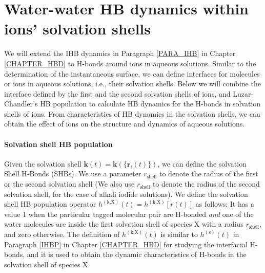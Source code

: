 \FloatBarrier
\section{Water-water HB dynamics within ions' solvation shells} \label{PARA_SHBD}
We will extend the IHB dynamics in Paragraph \ref{PARA_IHB} in Chapter \ref{CHAPTER_HBD} to H-bonds around ions in aqueous solutions. 
Similar to the determination of the instantaneous surface, we can define interfaces for molecules or ions in aqueous solutions, i.e., 
their solvation shells. 
Below we will combine the interface defined by the first and the second solvation shells of ions, 
and Luzar-Chandler's HB population \cite{AL96} to calculate HB
dynamics for the H-bonds in solvation shells of ions.
From characteristics of HB dynamics in the solvation shells, we can obtain the effect of ions on the structure and dynamics of aqueous solutions. 

\paragraph{Solvation shell HB population}\label{para:SHBP}
Given the solvation shell ${\mathbf k}(t)={\mathbf k}(\{{\mathbf r}_i(t)\})$, we can define the solvation Shell H-Bonds (SHBs).
We use a parameter $r_\text{shell}$ to denote the radius of the first or the second solvation shell 
(We also use $r_\text{shell}$ to denote the radius of the second solvation shell, for the case of alkali iodide solutions). 
We define the solvation shell HB population operator $h^{(\text{k,X})}(t) = h^{(\text{k,X})}[{r}(t)]$ as follows:
It has a value 1 when the particular tagged molecular pair are H-bonded \emph{and} one of the water molecules are inside the first solvation shell of species X
with a radius $r_\text{shell}$, and zero otherwise. 
The definition of $h^{(\text{k,X})}(t)$ is similar to $h^{(\text{s})}(t)$ in Paragraph \ref{IHBP} in Chapter \ref{CHAPTER_HBD} 
for studying the interfacial H-bonds, and it is used to obtain the dynamic characteristics of H-bonds in the solvation shell of species X. 

